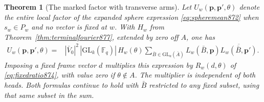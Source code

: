 \documentclass[a4paper,11pt]{article}
\newtheorem{theorem}[proposition]{Theorem}
\theoremstyle{definition}
\theoremstyle{remark}
\numberwithin{equation}{section}
\begin{document}
\begin{theorem}[The marked factor with transverse arms]\leavevmode
\label{thm:armopen879}
Let \(U_w(\mathbf p,\mathbf p',\theta)\) denote the entire local
factor of the expanded sphere expression \eqref{eq:spheremean872}
when \(s_w\in P_w\) and no vector is fixed at \(w\). With \(H_w\)
from Theorem~\ref{thm:terminalfourier877}, extended by zero off \(A\),
one has
\begin{align}
 U_w(\mathbf p,\mathbf p',\theta)
  ={}&|\bar V_0|^2\,|\mathrm{GL}_k(\mathbb F_q)|\,H_w(\theta)
        \sum_{\bar B\in\mathrm{GL}_a(\bar A)}
         L_w(\bar B,\mathbf p)\overline{L_w(\bar B,\mathbf p')}.
 \label{eq:armorbital879}
\end{align}
Imposing a fixed frame vector \(d\) multiplies this expression
by \(R_w(d,\theta)\) of \eqref{eq:fixedratio874}, with value zero
if \(\theta\notin A\). The multiplier is independent of both heads.
Both formulas continue to hold with \(\bar B\) restricted to any
fixed subset, using that same subset in the sum.
\end{theorem}
\end{document}

